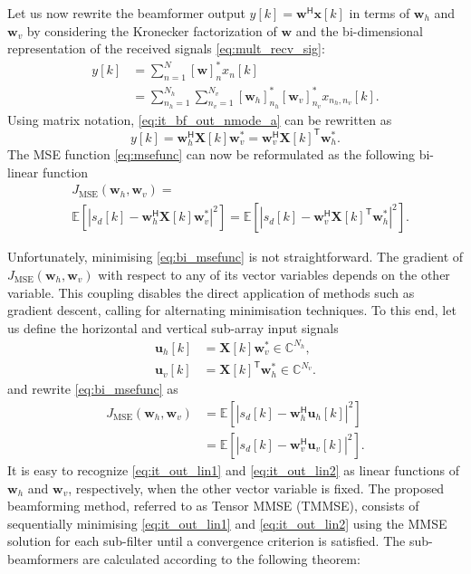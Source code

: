 \documentclass{cta-author}
\newcommand{\bmm}[1]{\ensuremath{\mathbb{#1}}}				%
\newcommand{\tran}{\mathsf{T}}						%
\newcommand{\hermit}{\mathsf{H}}					%
\begin{document}
Let us now rewrite the beamformer output $y[k] = \bm{w}^\hermit \bm{x}[k]$ in terms of $\bm{w}_h$ and $\bm{w}_v$ by considering the Kronecker factorization of $\bm{w}$ and the bi-dimensional representation of the received signals \eqref{eq:mult_recv_sig}:
\begin{align}
y[k] &= \sum_{n = 1}^N [\bm{w}]_n^* x_n[k]\\
	 &= \sum_{n_h=1}^{N_h} \sum_{n_v=1}^{N_v} [\bm{w}_h]_{n_h}^* [\bm{w}_v]_{n_v}^*  x_{n_h, n_v}[k]. \label{eq:it_bf_out_nmode_a}
\end{align}
Using matrix notation, \eqref{eq:it_bf_out_nmode_a} can be rewritten as
\begin{equation}
y[k] = \bm{w}_h^\hermit \bm{X}[k] \bm{w}_v^* = \bm{w}_v^\hermit \bm{X}[k]^\tran \bm{w}_h^*. \label{eq:it_bf_out_nmode}
\end{equation}
The MSE function \eqref{eq:msefunc} can now be reformulated as the following bi-linear function
\begin{align}
	&J_\textrm{MSE}(\bm{w}_h, \bm{w}_v) = \label{eq:bi_msefunc}\\
	& \bmm{E}\left[ \left| s_d[k] - \bm{w}_h^\hermit \bm{X}[k] \bm{w}_v^*\right|^2 \right] =\bmm{E}\left[ \left| s_d[k] - \bm{w}_v^\hermit \bm{X}[k]^\tran \bm{w}_h^*\right|^2 \right].
\end{align}

Unfortunately, minimising \eqref{eq:bi_msefunc} is not straightforward. The gradient of $J_\textrm{MSE}(\bm{w}_h, \bm{w}_v)$ with respect to any of its vector variables depends on the other variable. This coupling disables the direct application of methods such as gradient descent, calling for alternating minimisation techniques. To this end, let us define the horizontal and vertical sub-array input signals
\begin{align}
	\bm{u}_h[k] &=  \bm{X}[k] \bm{w}_v^* \in \bmm{C}^{N_h}, \label{eq:it_subsig_h}\\
	\bm{u}_v[k] &=  \bm{X}[k]^\tran \bm{w}_h^* \in \bmm{C}^{N_v}.  \label{eq:it_subsig_v}
\end{align}
and rewrite \eqref{eq:bi_msefunc} as
\begin{align}
	J_\textrm{MSE}(\bm{w}_h, \bm{w}_v) &= \bmm{E}\left[ \left| s_d[k] - \bm{w}_h^\hermit \bm{u}_h[k]\right|^2 \right] \label{eq:it_out_lin1}\\
	&= \bmm{E}\left[ \left| s_d[k] - \bm{w}_v^\hermit \bm{u}_v[k]\right|^2 \right]. \label{eq:it_out_lin2}
\end{align}
It is easy to recognize \eqref{eq:it_out_lin1} and \eqref{eq:it_out_lin2} as linear functions of $\bm{w}_h$ and $\bm{w}_v$, respectively, when the other vector variable is fixed. The proposed beamforming method, referred to as Tensor MMSE (TMMSE), consists of sequentially minimising \eqref{eq:it_out_lin1} and \eqref{eq:it_out_lin2} using the MMSE solution for each sub-filter until a convergence criterion is satisfied. The sub-beamformers are calculated according to the following theorem:
\end{document}
